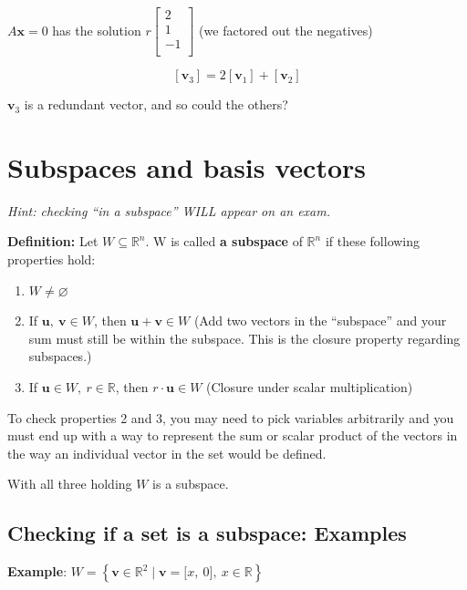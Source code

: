 \documentclass[
]{article}
\begin{document}
$A\mathbf{x} = 0$ has the solution $r\begin{bmatrix}
2 \\
1 \\
 - 1 \\
\end{bmatrix}$ (we factored out the negatives)

$$\left\lbrack {\mathbf{v}}_{3} \right\rbrack = 2\left\lbrack {\mathbf{v}}_{1} \right\rbrack + \left\lbrack {\mathbf{v}}_{2} \right\rbrack$$

${\mathbf{v}}_{3}$ is a redundant vector, and so could the others?


\section{Subspaces and basis
vectors}

\emph{Hint: checking ``in a subspace'' WILL appear on an exam.}

\textbf{Definition:} Let $W \subseteq \mathbb{R}^{n}\text{.\ W}$ is
called \textbf{a subspace} of $\mathbb{R}^{n}$ if these following
properties hold:

\begin{enumerate}
\def\labelenumi{\arabic{enumi}.}
\item
  $W \neq \varnothing$
\item
  If $\mathbf{u},\ \mathbf{v} \in W$, then
  $\mathbf{u} + \mathbf{v} \in W$ (Add two vectors in the
  ``subspace'' and your sum must still be within the subspace. This is
  the closure property regarding subspaces.)
\item
  If $\mathbf{u} \in W,\ r\mathbb{\in R}$, then
  $r \cdot \mathbf{u} \in W$ (Closure under scalar multiplication)
\end{enumerate}

To check properties 2 and 3, you may need to pick variables arbitrarily
and you must end up with a way to represent the sum or scalar product of
the vectors in the way an individual vector in the set would be defined.

With all three holding $W$ is a subspace.


\subsection{Checking if a set is a subspace:
Examples}

\textbf{Example}:
$W = \left\{ \mathbf{v} \in \mathbb{R}^{2}\mid\mathbf{v} = \lbrack x,\ 0\rbrack,\ x\mathbb{\in R} \right\}$
\end{document}

